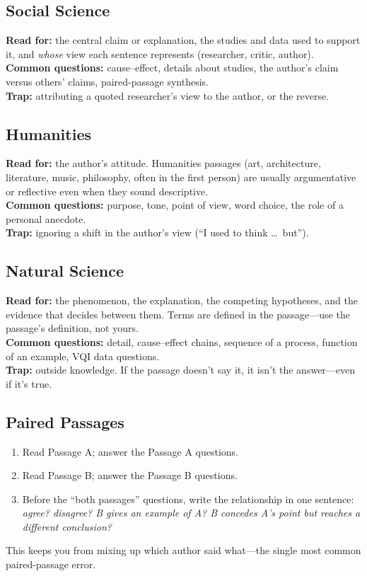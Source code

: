 \documentclass[11pt]{article}
\begin{document}
\subsection{Social Science}
\textbf{Read for:} the central claim or explanation, the studies and data used to support it, and \emph{whose} view each sentence represents (researcher, critic, author).\\
\textbf{Common questions:} cause--effect, details about studies, the author's claim versus others' claims, paired-passage synthesis.\\
\textbf{Trap:} attributing a quoted researcher's view to the author, or the reverse.

\subsection{Humanities}
\textbf{Read for:} the author's attitude. Humanities passages (art, architecture, literature, music, philosophy, often in the first person) are usually argumentative or reflective even when they sound descriptive.\\
\textbf{Common questions:} purpose, tone, point of view, word choice, the role of a personal anecdote.\\
\textbf{Trap:} ignoring a shift in the author's view (``I used to think \dots\ but'').

\subsection{Natural Science}
\textbf{Read for:} the phenomenon, the explanation, the competing hypotheses, and the evidence that decides between them. Terms are defined in the passage---use the passage's definition, not yours.\\
\textbf{Common questions:} detail, cause--effect chains, sequence of a process, function of an example, VQI data questions.\\
\textbf{Trap:} outside knowledge. If the passage doesn't say it, it isn't the answer---even if it's true.

\subsection{Paired Passages}
\begin{enumerate}
  \item Read Passage A; answer the Passage A questions.
  \item Read Passage B; answer the Passage B questions.
  \item Before the ``both passages'' questions, write the relationship in one sentence: \emph{agree? disagree? B gives an example of A? B concedes A's point but reaches a different conclusion?}
\end{enumerate}
This keeps you from mixing up which author said what---the single most common paired-passage error.
\end{document}
